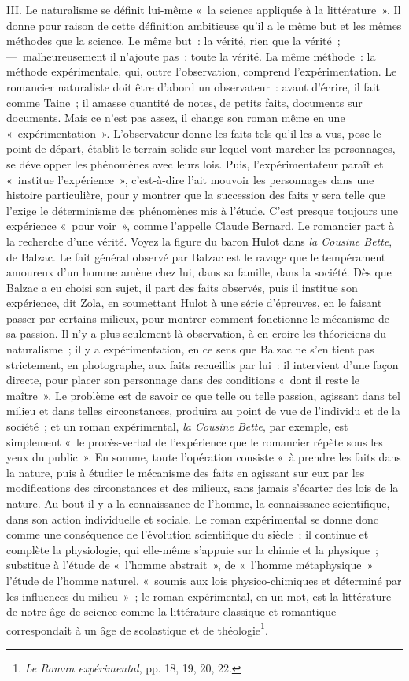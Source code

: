 \documentclass[french,twoside]{book} %
\begin{document}
III. Le naturalisme se définit lui-même « la science appliquée à la littérature ». Il donne pour raison de cette définition ambitieuse qu’il a le même but et les mêmes méthodes que la science. Le même but : la vérité, rien que la vérité ; — malheureusement il n’ajoute pas : toute la vérité. La même méthode : la méthode expérimentale, qui, outre l’observation, comprend l’expérimentation. Le romancier naturaliste doit être d’abord un observateur : avant d’écrire, il fait comme Taine ; il amasse quantité de notes, de petits faits, documents sur documents. Mais ce n’est pas assez, il change son roman même en une « expérimentation ». L’observateur donne les faits tels qu’il les a vus, pose le point de départ, établit le terrain solide sur lequel vont marcher les personnages, se développer les phénomènes avec leurs lois. Puis, l’expérimentateur paraît et « institue l’expérience », c’est-à-dire l’ait mouvoir les personnages dans une histoire particulière, pour y montrer que la succession des faits y sera telle que l’exige le déterminisme des phénomènes mis à l’étude. C’est presque toujours une expérience « pour voir », comme l’appelle Claude Bernard. Le romancier part à la recherche d’une vérité. Voyez la figure du baron Hulot dans \emph{la Cousine Bette}, de Balzac. Le fait général observé par Balzac est le ravage que le tempérament amoureux d’un homme amène chez lui, dans sa famille, dans la société. Dès que Balzac a eu choisi son sujet, il part des faits observés, puis il institue son expérience, dit Zola, en soumettant Hulot à une série d’épreuves, en le faisant passer par certains milieux, pour montrer comment fonctionne le mécanisme de sa passion. Il n’y a plus seulement là observation, à en croire les théoriciens du naturalisme ; il y a expérimentation, en ce sens que Balzac ne s’en tient pas strictement, en photographe, aux faits recueillis par lui : il intervient d’une façon directe, pour placer son personnage dans des conditions « dont il reste le maître ». Le problème est de savoir ce que telle ou telle passion, agissant dans tel milieu et dans telles circonstances, produira au point de vue de l’individu et de la société ; et un roman expérimental, \emph{la Cousine Bette}, par exemple, est simplement « le procès-verbal de l’expérience que le romancier répète sous les yeux du public ». En somme, toute l’opération consiste « à prendre les faits dans la nature, puis à étudier le mécanisme des faits en agissant sur eux par les modifications des circonstances et des milieux, sans jamais s’écarter des lois de la nature. Au bout il y a la connaissance de l’homme, la connaissance scientifique, dans son action individuelle et sociale. Le roman expérimental se donne donc comme une conséquence de l’évolution scientifique du siècle ; il continue et complète la physiologie, qui elle-même s’appuie sur la chimie et la physique ; substitue à l’étude de « l’homme abstrait », de « l’homme métaphysique » l’étude de l’homme naturel, « soumis aux lois physico-chimiques et déterminé par les influences du milieu » ; le roman expérimental, en un mot, est la littérature de notre âge de science comme la littérature classique et romantique correspondait à un âge de scolastique et de théologie\footnote{\emph{Le Roman expérimental}, pp. 18, 19, 20, 22.}.\par
\end{document}
